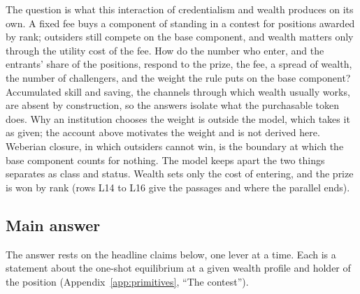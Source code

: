 The question is what this interaction of credentialism and wealth produces on
its own. A fixed fee buys a component of standing in a contest for positions
awarded by rank; outsiders still compete on the base component, and wealth
matters only through the utility cost of the fee. How do the number who enter,
and the entrants' share of the positions, respond to the prize, the fee, a
spread of wealth, the number of challengers, and the weight the rule puts on
the base component? Accumulated skill and saving, the channels through which
wealth usually works, are absent by construction, so the answers isolate what
the purchasable token does. Why an institution chooses the weight is outside
the model, which takes it as given; the account above motivates the weight and is not derived here. Weberian closure, in which
outsiders cannot win, is the boundary at which the base component counts for
nothing. The model keeps apart the two things \citet{Weber1978} separates as
class and status. Wealth sets only the cost of entering, and the prize is won
by rank (rows L14 to L16 give the passages and where the parallel ends).

\subsection{Main answer}
\label{sec:answer}

The answer rests on the headline claims below, one lever at a time. Each is a
statement about the one-shot equilibrium at a given wealth profile and holder
of the position (Appendix~\ref{app:primitives}, ``The contest'').

